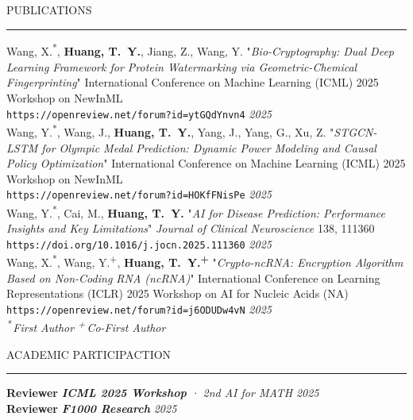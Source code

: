 \documentclass{resume} %
\renewenvironment{rSection}[1]{
\sectionskip
\textcolor{TsinghuaPurple}{\MakeUppercase{#1}}
\sectionlineskip
\hrule
\begin{list}{}{
\setlength{\leftmargin}{0em}
}
\item[]
}{
\end{list}
}
\begin{document}
\begin{rSection}{Publications}\itemsep -3pt         

{Wang, X.\textsuperscript{*}, \textbf{Huang, T.~Y.}, Jiang, Z., Wang, Y.  
"\textit{Bio\mbox{-}Cryptography: Dual Deep Learning Framework for Protein Watermarking via Geometric\mbox{-}Chemical Fingerprinting}"  
International Conference on Machine Learning (ICML) 2025 Workshop on NewInML} \\
\texttt{https://openreview.net/forum?id=ytGQdYnvn4} \hfill \textit{2025} \\
{Wang, Y.\textsuperscript{*}, Wang, J., \textbf{Huang, T.~Y.}, Yang, J., Yang, G., Xu, Z.  
"\textit{STGCN\mbox{-}LSTM for Olympic Medal Prediction: Dynamic Power Modeling and Causal Policy Optimization}"  
International Conference on Machine Learning (ICML) 2025 Workshop on NewInML} \\
\texttt{https://openreview.net/forum?id=HOKfFNisPe} \hfill \textit{2025} \\
{Wang, Y.\textsuperscript{*}, Cai, M., \textbf{Huang, T.~Y.}  
"\textit{AI for Disease Prediction: Performance Insights and Key Limitations}"  
\textit{Journal of Clinical Neuroscience} 138, 111360}\\
\texttt{https://doi.org/10.1016/j.jocn.2025.111360} \hfill \textit{2025} \\
{Wang, X.\textsuperscript{*}, Wang, Y.\textsuperscript{+}, \textbf{Huang, T.~Y.\textsuperscript{+}}  
"\textit{Crypto\mbox{-}ncRNA: Encryption Algorithm Based on Non\mbox{-}Coding RNA (ncRNA)}"  
International Conference on Learning Representations (ICLR) 2025 Workshop on AI for Nucleic Acids (NA)}\\
\texttt{https://openreview.net/forum?id=j6ODUDw4vN} \hfill \textit{2025} \\
\textit{\footnotesize \textsuperscript{*}\,First Author \quad \textsuperscript{+}\,Co-First Author}
\end{rSection}

\begin{rSection}{ACADEMIC PARTICIPACTION}\itemsep -3pt

{\bf Reviewer} \quad \textit{\textbf{ICML 2025 Workshop} · 2nd AI for MATH} \hfill \textit{2025}\\
{\bf Reviewer} \quad \textit{\textbf{F1000 Research}} \hfill \textit{2025}
\end{rSection}
\end{document}
